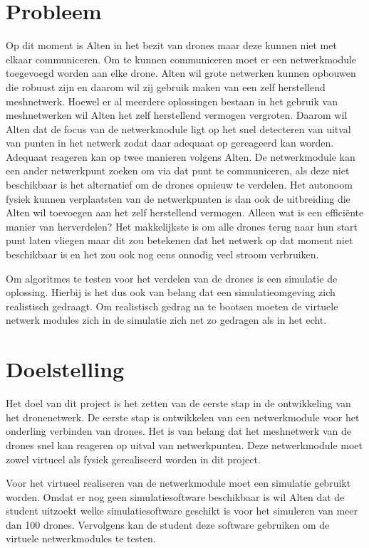 \documentclass[a4paper, 11pt, oneside]{report}
\begin{document}
\section{Probleem}\label{sec:probleem}
Op dit moment is Alten in het bezit van drones maar deze kunnen niet met elkaar communiceren.
Om te kunnen communiceren moet er een netwerkmodule toegevoegd worden aan elke drone.
Alten wil grote netwerken kunnen opbouwen die robuust zijn en daarom wil zij gebruik maken van een zelf herstellend meshnetwerk.
Hoewel er al meerdere oplossingen bestaan in het gebruik van meshnetwerken wil Alten het zelf herstellend vermogen vergroten. 
Daarom wil Alten dat de focus van de netwerkmodule ligt op het snel detecteren van uitval van punten in het netwerk zodat daar adequaat op gereageerd kan worden.
Adequaat reageren kan op twee manieren volgens Alten.
De netwerkmodule kan een ander netwerkpunt zoeken om via dat punt te communiceren, als deze niet beschikbaar is het alternatief om de drones opnieuw te verdelen.
Het autonoom fysiek kunnen verplaatsten van de netwerkpunten is dan ook de uitbreiding die Alten wil toevoegen aan het zelf herstellend vermogen.
Alleen wat is een efficiënte manier van herverdelen?
Het makkelijkste is om alle drones terug naar hun start punt laten vliegen maar dit zou betekenen dat het netwerk op dat moment niet beschikbaar is en het zou ook nog eens onnodig veel stroom verbruiken.

Om algoritmes te testen voor het verdelen van de drones is een simulatie de oplossing.
Hierbij is het dus ook van belang dat een simulatieomgeving zich realistisch gedraagt. 
Om realistisch gedrag na te bootsen moeten de virtuele netwerk modules zich in de simulatie zich net zo gedragen als in het echt.

\section{Doelstelling}\label{sec:doelstelling}
Het doel van dit project is het zetten van de eerste stap in de ontwikkeling van het dronenetwerk.
De eerste stap is ontwikkelen van een netwerkmodule voor het onderling verbinden van drones.
Het is van belang dat het meshnetwerk van de drones snel kan reageren op uitval van netwerkpunten.
Deze netwerkmodule moet zowel virtueel als fysiek gerealiseerd worden in dit project.

Voor het virtueel realiseren van de netwerkmodule moet een simulatie gebruikt worden. 
Omdat er nog geen simulatiesoftware beschikbaar is wil Alten dat de student uitzoekt welke simulatiesoftware geschikt is voor het simuleren van meer dan 100 drones.
Vervolgens kan de student deze software gebruiken om de virtuele netwerkmodules te testen.
\end{document}

